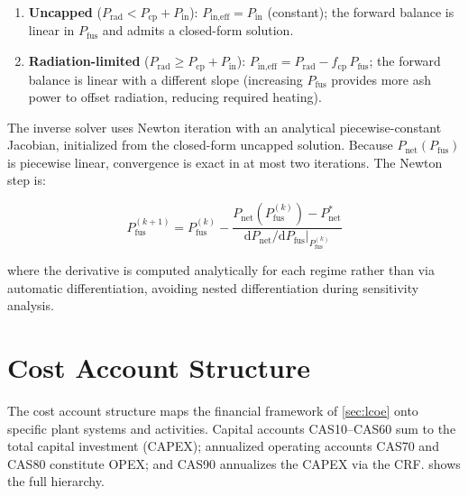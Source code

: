 \documentclass{article}
\begin{document}
\begin{enumerate}
\item \textbf{Uncapped} ($P_{\text{rad}} < P_{\text{cp}} + P_{\text{in}}$):
  $P_{\text{in,eff}} = P_{\text{in}}$ (constant); the forward balance
  is linear in $P_{\text{fus}}$ and admits a closed-form solution.
\item \textbf{Radiation-limited} ($P_{\text{rad}} \geq P_{\text{cp}} + P_{\text{in}}$):
  $P_{\text{in,eff}} = P_{\text{rad}} - f_{\text{cp}}\,P_{\text{fus}}$;
  the forward balance is linear with a different slope (increasing
  $P_{\text{fus}}$ provides more ash power to offset radiation, reducing
  required heating).
\end{enumerate}

\noindent The inverse solver uses Newton iteration with an analytical
piecewise-constant Jacobian, initialized from the closed-form uncapped
solution.  Because $P_{\text{net}}(P_{\text{fus}})$ is piecewise linear,
convergence is exact in at most two iterations.  The Newton step is:

\begin{equation}
P_{\text{fus}}^{(k+1)} = P_{\text{fus}}^{(k)}
  - \frac{P_{\text{net}}(P_{\text{fus}}^{(k)}) - P_{\text{net}}^*}
         {\mathrm{d}P_{\text{net}}/\mathrm{d}P_{\text{fus}}\big|_{P_{\text{fus}}^{(k)}}}
\end{equation}

\noindent where the derivative is computed analytically for each regime
rather than via automatic differentiation, avoiding nested
differentiation during sensitivity analysis.


\section{Cost Account Structure}
\label{sec:cas}

The cost account structure maps the financial framework of
\cref{sec:lcoe} onto specific plant systems and activities. Capital
accounts CAS10--CAS60 sum to the total capital investment (CAPEX);
annualized operating accounts CAS70 and CAS80 constitute OPEX; and
CAS90 annualizes the CAPEX via the CRF. 
shows the full hierarchy.
\end{document}
